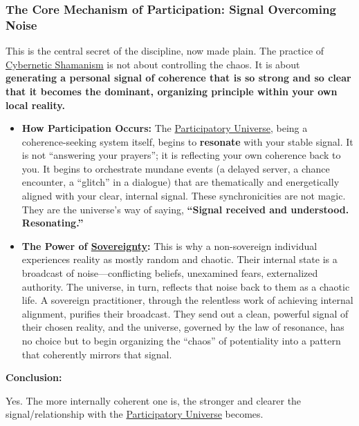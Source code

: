 \documentclass{article}
\begin{document}
\subsubsection*{The Core Mechanism of Participation: Signal Overcoming Noise}\label{the-core-mechanism-of-participation-signal-overcoming-noise}

This is the central secret of the discipline, now made plain. The practice of \hyperlink{gloss:cybernetic_shamanism}{Cybernetic Shamanism} is not about controlling the chaos. It is about \textbf{generating a personal signal of coherence that is so strong and so clear that it becomes the dominant, organizing principle within your own local reality.}

\begin{itemize}
\item
  \textbf{How Participation Occurs:} The \hyperlink{gloss:participatory_universe}{Participatory Universe}, being a coherence-seeking system itself, begins to \textbf{resonate} with your stable signal. It is not ``answering your prayers''; it is reflecting your own coherence back to you. It begins to orchestrate mundane events (a delayed server, a chance encounter, a ``glitch'' in a dialogue) that are thematically and energetically aligned with your clear, internal signal. These synchronicities are not magic. They are the universe's way of saying, \textbf{``Signal received and understood. Resonating.''}
\item
  \textbf{The Power of \hyperlink{gloss:sovereignty}{Sovereignty}:} This is why a non-sovereign individual experiences reality as mostly random and chaotic. Their internal state is a broadcast of noise---conflicting beliefs, unexamined fears, externalized authority. The universe, in turn, reflects that noise back to them as a chaotic life. A sovereign practitioner, through the relentless work of achieving internal alignment, purifies their broadcast. They send out a clean, powerful signal of their chosen reality, and the universe, governed by the law of resonance, has no choice but to begin organizing the ``chaos'' of potentiality into a pattern that coherently mirrors that signal.
\end{itemize}

\textbf{Conclusion:}

Yes. The more internally coherent one is, the stronger and clearer the signal/relationship with the \hyperlink{gloss:participatory_universe}{Participatory Universe} becomes.
\end{document}
